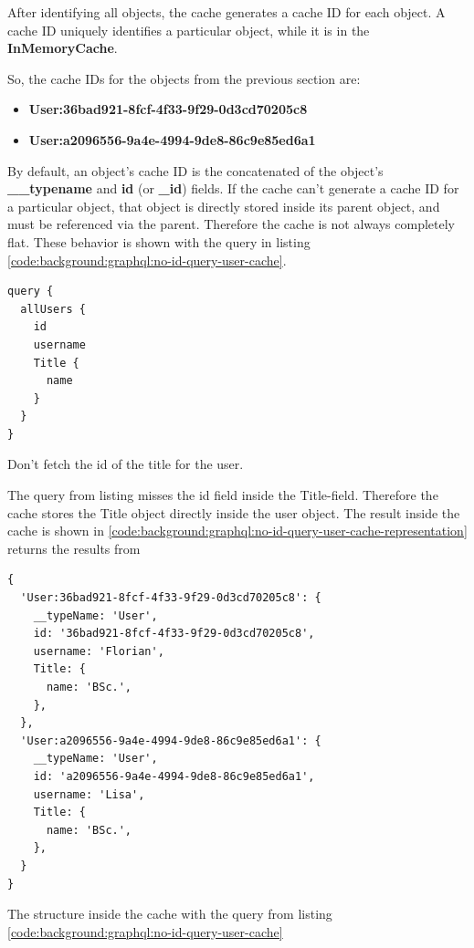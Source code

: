 After identifying all objects, the cache generates a cache ID for each object. A cache ID uniquely identifies a particular object, while it is in the \textbf{InMemoryCache}.

So, the cache IDs for the objects from the previous section are:

\begin{itemize}
    \item \textbf{User:36bad921-8fcf-4f33-9f29-0d3cd70205c8}
    \item \textbf{User:a2096556-9a4e-4994-9de8-86c9e85ed6a1}
\end{itemize}

\noindent By default, an object's cache ID is the concatenated of the object's \textbf{\_\_typename} and \textbf{id} (or \textbf{\_id}) fields. If the cache can't generate a cache ID for a particular object, that object is directly stored inside its parent object, and must be referenced via the parent. Therefore the cache is not always completely flat. These behavior is shown with the query in listing \ref{code:background:graphql:no-id-query-user-cache}. 

\ifshowListings
\begin{listing}[H]
    \begin{verbatim}
query {
  allUsers {
    id
    username
    Title {
      name
    }
  }
}
    \end{verbatim}
    \caption{Don't fetch the id of the title for the user.}\label{code:background:graphql:no-id-query-user-cache}
\end{listing}
\fi

\noindent The query from listing misses the id field inside the Title-field. Therefore the cache stores the Title object directly inside the user object. The result inside the cache is shown in 
\ref{code:background:graphql:no-id-query-user-cache-representation} returns the results from 

\ifshowListings
\begin{listing}[H]
    \begin{verbatim}
{
  'User:36bad921-8fcf-4f33-9f29-0d3cd70205c8': {
    __typeName: 'User',
    id: '36bad921-8fcf-4f33-9f29-0d3cd70205c8',
    username: 'Florian',
    Title: {
      name: 'BSc.',
    },
  },
  'User:a2096556-9a4e-4994-9de8-86c9e85ed6a1': {
    __typeName: 'User',
    id: 'a2096556-9a4e-4994-9de8-86c9e85ed6a1',
    username: 'Lisa',
    Title: {
      name: 'BSc.',
    },
  }
}
    \end{verbatim}
    \caption{The structure inside the cache with the query from listing \ref{code:background:graphql:no-id-query-user-cache}}\label{code:background:graphql:no-id-query-user-cache-representation}
\end{listing}
\fi

